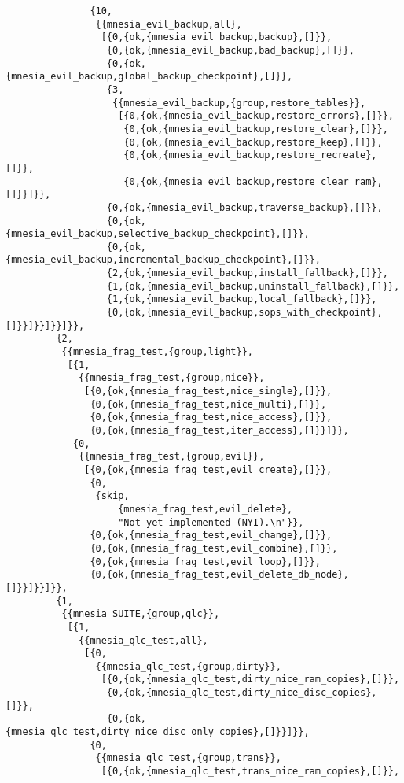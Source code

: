 \begin{verbatim}
               {10,
                {{mnesia_evil_backup,all},
                 [{0,{ok,{mnesia_evil_backup,backup},[]}},
                  {0,{ok,{mnesia_evil_backup,bad_backup},[]}},
                  {0,{ok,{mnesia_evil_backup,global_backup_checkpoint},[]}},
                  {3,
                   {{mnesia_evil_backup,{group,restore_tables}},
                    [{0,{ok,{mnesia_evil_backup,restore_errors},[]}},
                     {0,{ok,{mnesia_evil_backup,restore_clear},[]}},
                     {0,{ok,{mnesia_evil_backup,restore_keep},[]}},
                     {0,{ok,{mnesia_evil_backup,restore_recreate},[]}},
                     {0,{ok,{mnesia_evil_backup,restore_clear_ram},[]}}]}},
                  {0,{ok,{mnesia_evil_backup,traverse_backup},[]}},
                  {0,{ok,{mnesia_evil_backup,selective_backup_checkpoint},[]}},
                  {0,{ok,{mnesia_evil_backup,incremental_backup_checkpoint},[]}},
                  {2,{ok,{mnesia_evil_backup,install_fallback},[]}},
                  {1,{ok,{mnesia_evil_backup,uninstall_fallback},[]}},
                  {1,{ok,{mnesia_evil_backup,local_fallback},[]}},
                  {0,{ok,{mnesia_evil_backup,sops_with_checkpoint},[]}}]}}]}}]}},
         {2,
          {{mnesia_frag_test,{group,light}},
           [{1,
             {{mnesia_frag_test,{group,nice}},
              [{0,{ok,{mnesia_frag_test,nice_single},[]}},
               {0,{ok,{mnesia_frag_test,nice_multi},[]}},
               {0,{ok,{mnesia_frag_test,nice_access},[]}},
               {0,{ok,{mnesia_frag_test,iter_access},[]}}]}},
            {0,
             {{mnesia_frag_test,{group,evil}},
              [{0,{ok,{mnesia_frag_test,evil_create},[]}},
               {0,
                {skip,
                    {mnesia_frag_test,evil_delete},
                    "Not yet implemented (NYI).\n"}},
               {0,{ok,{mnesia_frag_test,evil_change},[]}},
               {0,{ok,{mnesia_frag_test,evil_combine},[]}},
               {0,{ok,{mnesia_frag_test,evil_loop},[]}},
               {0,{ok,{mnesia_frag_test,evil_delete_db_node},[]}}]}}]}},
         {1,
          {{mnesia_SUITE,{group,qlc}},
           [{1,
             {{mnesia_qlc_test,all},
              [{0,
                {{mnesia_qlc_test,{group,dirty}},
                 [{0,{ok,{mnesia_qlc_test,dirty_nice_ram_copies},[]}},
                  {0,{ok,{mnesia_qlc_test,dirty_nice_disc_copies},[]}},
                  {0,{ok,{mnesia_qlc_test,dirty_nice_disc_only_copies},[]}}]}},
               {0,
                {{mnesia_qlc_test,{group,trans}},
                 [{0,{ok,{mnesia_qlc_test,trans_nice_ram_copies},[]}},

\end{verbatim}
